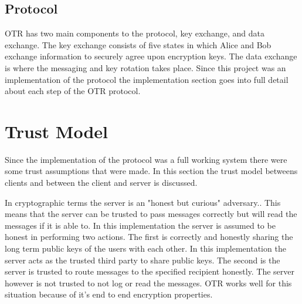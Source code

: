 \subsection{Protocol}


OTR has two main components to the protocol, key exchange, and data exchange. The key exchange consists of five states in which Alice and Bob exchange information to securely agree upon encryption keys. The data exchange is where the messaging and key rotation takes place.
Since this project was an implementation of the protocol the implementation section goes into full detail about each step of the OTR protocol.\cite{otr-protocol}


\section{Trust Model}


Since the implementation of the protocol was a full working system there were some trust assumptions that were made. In this section the trust model betweens clients and between the client and server is discussed. 


In cryptographic terms the server is an "honest but curious" adversary.\cite{sjcl-paper}. This means that the server can be trusted to pass messages correctly but will read the messages if it is able to. In this implementation the server is assumed to be honest in performing two actions. The first is correctly and honestly sharing the long term public keys of the users with each other. In this implementation the server acts as the trusted third party to share public keys. The second is the server is trusted to route messages to the specified recipient honestly. The server however is not trusted to not log or read the messages. OTR works well for this situation because of it’s end to end encryption properties.

